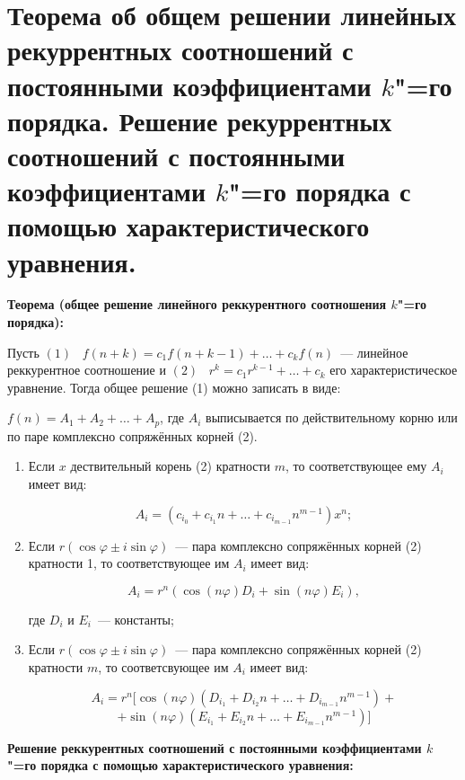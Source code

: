 \section{Теорема об общем решении линейных рекуррентных соотношений с постоянными 
коэффициентами $k$"=го порядка. Решение рекуррентных соотношений с 
постоянными коэффициентами $k$"=го порядка с помощью характеристического 
уравнения.}

\textbf{Теорема (общее решение линейного реккурентного соотношения $k$"=го
порядка):}
    \smallskip

    Пусть $(1) \;\;\; f(n + k) = c_1 f(n + k - 1) + \dots + c_k f(n)$~--- линейное реккурентное
    соотношение и $(2) \;\;\; r^k = c_1 r^{k - 1} + \dots + c_k$ его характеристическое
    уравнение. Тогда общее решение (1) можно записать в виде:
    \smallskip

    $f(n) = A_1 + A_2 + \dots + A_p$, где $A_i$ выписывается по действительному
    корню или по паре комплексно сопряжённых корней (2).

    \begin{enumerate}
        \item{Если $x$ дествительный корень (2) кратности $m$, то соответствующее
        ему $A_i$ имеет вид:
        
        \[
            A_i = (c_{i_0} + c_{i_1} n + \dots + c_{i_{m - 1}}n^{m - 1}) x^n;  
        \]}
        \item{Если $r(\cos \varphi \pm i \sin \varphi)$~--- пара комплексно 
        сопряжённых корней (2) кратности 1, то соответствующее им $A_i$ 
        имеет вид:
        
        \[
            A_i = r^n (\cos (n \varphi) D_i + \sin (n \varphi) E_i),  
        \]

        где $D_i$ и $E_i$~--- константы;}
        \item{Если $r(\cos \varphi \pm i \sin \varphi)$~--- пара комплексно
        сопряжённых корней (2) кратности $m$, то соответсвующее им $A_i$
        имеет вид:
        
        \[
            A_i = r^n [ \cos (n \varphi) (D_{i_1} + D_{i_2}n + \dots +
            D_{i_{m - 1}}n^{m - 1}) + 
        \]
        \[    
            + \sin (n \varphi) (E_{i_1} + E_{i_2}n + \dots +
            E_{i_{m - 1}}n^{m - 1})]  
        \]}
    \end{enumerate}
    \bigskip

\textbf{Решение реккурентных соотношений с постоянными коэффициентами $k$"=го порядка
с помощью характеристического уравнения:}
    \smallskip
    
